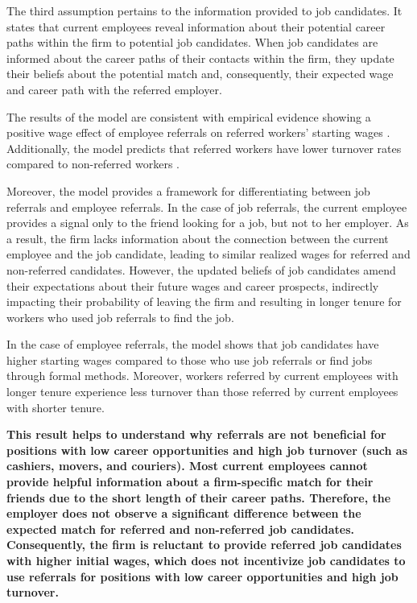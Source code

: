 \documentclass[12pt]{article}
\begin{document}
The third assumption pertains to the information provided to job candidates. It states that current employees reveal information about their potential career paths within the firm to potential job candidates. When job candidates are informed about the career paths of their contacts within the firm, they update their beliefs about the potential match and, consequently, their expected wage and career path with the referred employer.

The results of the model are consistent with empirical evidence showing a positive wage effect of employee referrals on referred workers' starting wages \citep{brown2016informal, dustmann2016referral, galenianos2013learning, montgomery1991social, simon1992matchmaker, corcoran1980most}. Additionally, the model predicts that referred workers have lower turnover rates compared to non-referred workers \citep{simon1992matchmaker, dustmann2016referral, brown2016informal}.

Moreover, the model provides a framework for differentiating between job referrals and employee referrals. In the case of job referrals, the current employee provides a signal only to the friend looking for a job, but not to her employer. As a result, the firm lacks information about the connection between the current employee and the job candidate, leading to similar realized wages for referred and non-referred candidates. However, the updated beliefs of job candidates amend their expectations about their future wages and career prospects, indirectly impacting their probability of leaving the firm and resulting in longer tenure for workers who used job referrals to find the job.

In the case of employee referrals, the model shows that job candidates have higher starting wages compared to those who use job referrals or find jobs through formal methods. Moreover, workers referred by current employees with longer tenure experience less turnover than those referred by current employees with shorter tenure.

\textbf{This result helps to understand why referrals are not beneficial for positions with low career opportunities and high job turnover (such as cashiers, movers, and couriers). Most current employees cannot provide helpful information about a firm-specific match for their friends due to the short length of their career paths.  Therefore, the employer does not observe a significant difference between the expected match for referred and non-referred job candidates. Consequently, the firm is reluctant to provide referred job candidates with higher initial wages, which does not incentivize job candidates to use referrals for positions with low career opportunities and high job turnover.}
\end{document}
